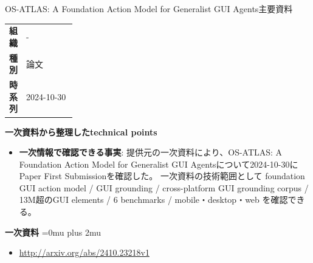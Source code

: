 \begin{technicalnote}{OS-ATLAS: A Foundation Action Model for Generalist GUI Agents}{主要資料}
\begingroup
\begin{tabularx}{\linewidth}{@{}>{\bfseries}p{0.22\linewidth}X@{}}
組織 & - \\
種別 & 論文 \\
時系列 & 2024-10-30 \\
\end{tabularx}
\smallskip
{\bfseries 一次資料から整理したtechnical points}
\begin{itemize}[leftmargin=1.5em,itemsep=0.35em]
\item \textbf{一次情報で確認できる事実}: 提供元の一次資料により、OS-ATLAS: A Foundation Action Model for Generalist GUI Agentsについて2024-10-30にPaper First Submissionを確認した。 一次資料の技術範囲として foundation GUI action model / GUI grounding / cross-platform GUI grounding corpus / 13M超のGUI elements / 6 benchmarks / mobile・desktop・web を確認できる。
\end{itemize}
\begin{minipage}{\linewidth}
\begin{samepage}
{\bfseries 一次資料}
\begingroup\sloppy
\Urlmuskip=0mu plus 2mu\relax
\begin{itemize}[leftmargin=1.5em,itemsep=0.25em]
\item {\scriptsize\url{http://arxiv.org/abs/2410.23218v1}}
\end{itemize}
\endgroup
\end{samepage}
\end{minipage}
\endgroup
\end{technicalnote}
\medskip

